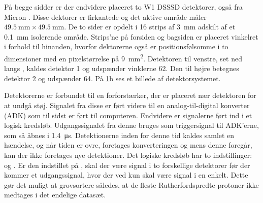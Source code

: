 På begge sidder er der endvidere placeret to W1 DSSSD detektorer, også fra Micron
\cite{micron-W1}. Disse dektorer er firkantede og det aktive område måler
${\SI{49.5}{\mm} \times \SI{49.5}{\mm}}$. De to sider er opdelt i 16 strips af \SI{3}{\mm}
adskilt af et \SI{0.1}{\mm} isolerende område. Strips'ne på forsiden og bagsiden er placeret
vinkelret i forhold til hinanden, hvorfor dektorerne også er positionsfølsomme i to dimensioner
med en pixelstørrelse på \SI{9}{\mm\squared}. Detektoren til venstre, set ned langs \beamline,
kaldes detektor 1 og udspænder vinklerne 62\degree. Den til højre betegnes detektor 2 og
udspænder 64\degree. På \cref{fig:detektordistro}b ses et billede af
detektorsystemet.
\begin{figure}[b]
  \vspace{-5mm}
  \centering
  \hfill
  \caption{}
  \label{fig:detektordistro}
  \vspace{-1cm}
\end{figure}


Detektorerne er forbundet til en forforstærker, der er placeret nær detektoren for at undgå
støj. Signalet fra disse er ført videre til en analog-til-digital konverter (ADK) som til sidst er
ført til computeren. Endvidere er signalerne ført ind i et logisk kredsløb. Udgangssignalet fra
denne bruges som triggersignal til ADK'erne, som så åbnes i \SI{1.4}{\micro\s}. Detektionerne inden
for denne tid kaldes samlet en hændelse, og når tiden er ovre, foretages konverteringen og mens denne
foregår, kan der ikke foretages nye detektioner. Det logiske kredsløb har to indstillinger: \lAND og
\lOR. Er den indstillet på \lAND, skal der være signal i to forskellige detektorer før der kommer et
udgangssignal, hvor der ved \lOR kun skal være signal i en enkelt. Dette gør det muligt at
grovsortere således, at de fleste Rutherfordspredte protoner ikke medtages i det endelige datasæt.
